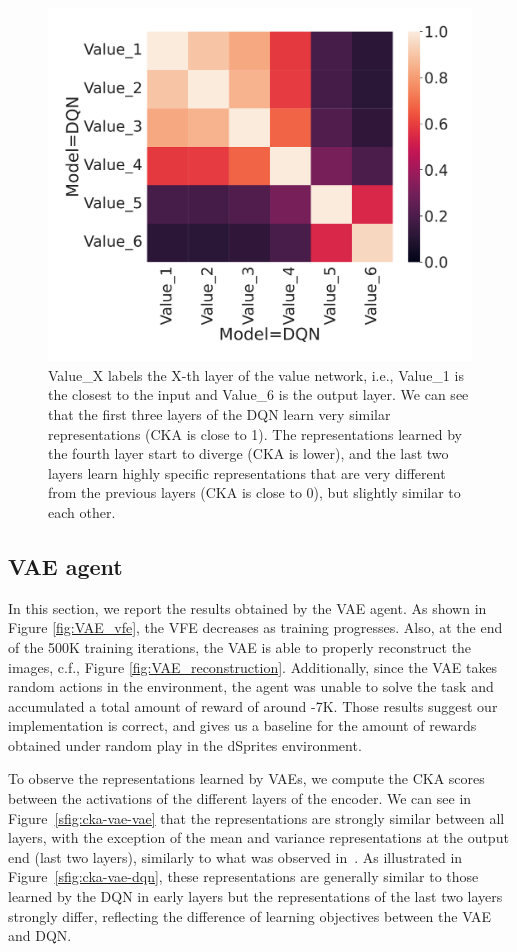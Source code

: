 \documentclass[twoside,11pt]{article}
\providecommand{\DIFadd}[1]{{\protect\color{blue}\uwave{#1}}} %
\providecommand{\DIFaddbegin}{} %
\providecommand{\DIFaddend}{} %
\begin{document}
\begin{figure}[H]
    \centering
    \includegraphics[width=0.5\linewidth]{cka_figures/CKA_dqn_1_dqn_1}
    \caption{Value\_X labels the X-th layer of the value network, i.e., Value\_1 is the closest to the input and Value\_6 is the output layer. We can see that the first three layers of the DQN learn very similar representations (CKA is close to 1). The representations learned by the fourth layer start to diverge (CKA is lower), and the last two layers learn highly specific representations that are very different from the previous layers (CKA is close to 0), but slightly similar to each other.}\label{fig:cka-dqn}
\end{figure}

\subsection{VAE agent} \label{ssec:vae_results}

In this section, we report the results obtained by the VAE agent. As shown in Figure \ref{fig:VAE_vfe}, the VFE decreases as training progresses. Also, at the end of the 500K training iterations, the VAE is able to properly reconstruct the  images, c.f., Figure \ref{fig:VAE_reconstruction}. Additionally, since the VAE takes random actions in the environment, the agent was unable to solve the task and accumulated a total amount of reward of around -7K. Those results suggest our implementation is correct, and gives us a baseline for the amount of rewards obtained under random play in the dSprites environment.

To observe the representations learned by VAEs, we compute the CKA scores between the activations of the different layers of the encoder. We can see in Figure~\ref{sfig:cka-vae-vae} that the representations are strongly similar between all layers, with the exception of the mean and variance representations at the output end (last two layers), similarly to what was observed in~\citet{Bonheme2022}\DIFaddbegin \DIFadd{, and is therefore expected}\DIFaddend . As illustrated in Figure~\ref{sfig:cka-vae-dqn}, these representations are generally similar to those learned by the DQN in early layers but the representations of the last two layers strongly differ, reflecting the difference of learning objectives between the VAE and DQN.
\end{document}
